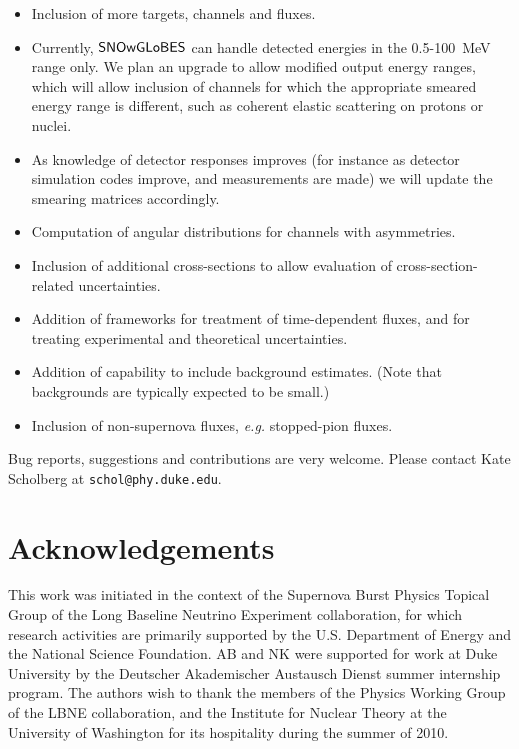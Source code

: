 \documentclass[12pt]{article}
\newcommand{\snowglobes}{\sf{SNOwGLoBES}}
\begin{document}
\begin{itemize}

\item Inclusion of more targets, channels and fluxes.

\item Currently, $\snowglobes$ can handle detected energies in the
  0.5-100~MeV range only.  We plan an upgrade to allow modified output
  energy ranges, which will allow inclusion of channels for which
  the appropriate smeared energy range is different, such as coherent elastic
  scattering on protons or nuclei.

\item As knowledge of detector responses improves (for instance as
  detector simulation codes improve, and measurements are made) we
  will update the smearing matrices accordingly.

\item Computation of angular distributions for channels with asymmetries.

\item Inclusion of additional cross-sections to allow evaluation of cross-section-related uncertainties.

\item Addition of frameworks for treatment of time-dependent fluxes, and for treating experimental and theoretical uncertainties.

\item Addition of capability to include background estimates. (Note that backgrounds are typically expected to be small.)


\item Inclusion of 
   non-supernova fluxes, \textit{e.g.} stopped-pion fluxes.

\end{itemize}

Bug reports, suggestions and contributions are very welcome.  Please
contact Kate Scholberg at \texttt{schol@phy.duke.edu}.


\section{Acknowledgements}

This work was initiated in the context of the Supernova Burst Physics
Topical Group of the Long Baseline Neutrino Experiment collaboration,
for which research activities are primarily supported by the
U.S. Department of Energy and the National Science Foundation.  AB and
NK were supported for work at Duke University by the Deutscher
Akademischer Austausch Dienst summer internship program.  The authors
wish to thank the members of the Physics Working Group of the LBNE
collaboration, and the Institute for Nuclear Theory at the
University of Washington for its
hospitality during the summer of 2010.
\end{document}
